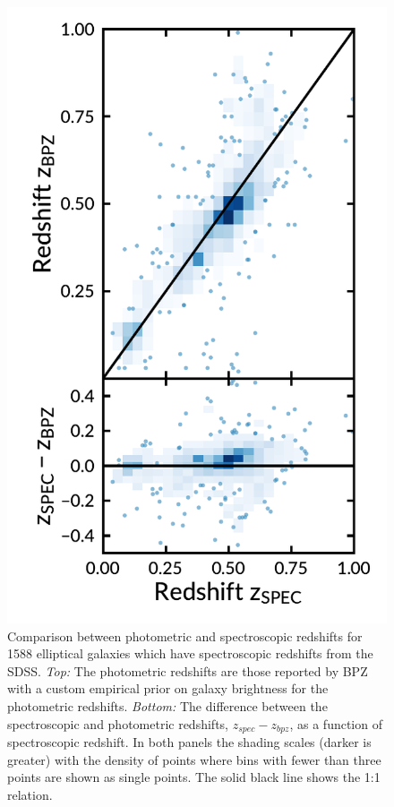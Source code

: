 \documentclass[apj, revtex4-1]{emulateapj}
\begin{document}
\begin{figure}
	\includegraphics[width=\columnwidth]{figures/specVSphot.pdf}
	\caption{Comparison between photometric and spectroscopic redshifts for 1588 elliptical galaxies which have spectroscopic redshifts from the SDSS. \textit{Top:} The photometric redshifts are those reported by BPZ with a custom empirical prior on galaxy brightness for the photometric redshifts. \textit{Bottom:} The difference between the spectroscopic and photometric redshifts, $z_{spec} - z_{bpz}$, as a function of spectroscopic redshift. In both panels the shading scales (darker is greater) with the density of points where bins with fewer than three points are shown as single points. The solid black line shows the 1:1 relation.}
	\label{fig:photozspecz}
\end{figure}
\end{document}
